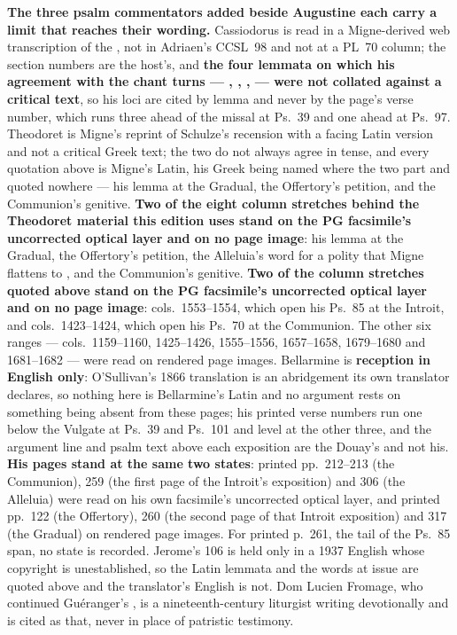 \textbf{The three psalm commentators added beside Augustine each carry a limit
that reaches their wording.} Cassiodorus is read in a Migne-derived web
transcription of the , not in Adriaen's CCSL~98 and
not at a PL~70 column; the section numbers are the host's, and \textbf{the four
lemmata on which his agreement with the chant turns --- ,
, ,  --- were not collated
against a critical text}, so his loci are cited by lemma and never by the page's
verse number, which runs three ahead of the missal at Ps.~39 and one ahead at
Ps.~97. Theodoret is Migne's reprint of Schulze's recension with a facing Latin
version and not a critical Greek text; the two do not always agree in tense, and
every quotation above is Migne's Latin, his Greek being named where the two part
and quoted nowhere ---%
\ifdefined\TriptychSynthesisEdition{} his lemma at the Gradual, the Offertory's petition, and the
Communion's genitive. \textbf{Two of the eight column stretches behind the
Theodoret material this edition uses stand on the PG facsimile's uncorrected
optical layer and on no page image}:%
\else{} his lemma at the Gradual, the Offertory's petition, the Alleluia's word for a
polity that Migne flattens to , and the Communion's genitive.
\textbf{Two of the column stretches quoted above stand on the PG facsimile's
uncorrected optical layer and on no page image}:%
\fi{} cols.\ 1553--1554, which open
his Ps.~85 at the Introit, and cols.\ 1423--1424, which open his Ps.~70 at the
Communion. The other six ranges --- cols.\ 1159--1160, 1425--1426, 1555--1556,
1657--1658, 1679--1680 and 1681--1682 --- were read on rendered page images.
Bellarmine is \textbf{reception in English only}: O'Sullivan's 1866 translation is an
abridgement its own translator declares, so nothing here is Bellarmine's Latin
and no argument rests on something being absent from these pages; his printed
verse numbers run one below the Vulgate at Ps.~39 and Ps.~101 and level at the
other three, and the argument line and psalm text above each exposition are the
Douay's and not his. \textbf{His pages stand at the same two states}: printed
pp.~212--213 (the Communion), 259 (the first page of the Introit's exposition)
and 306 (the Alleluia) were read on his own facsimile's uncorrected optical
layer, and printed pp.~122 (the Offertory), 260 (the second page of that Introit
exposition) and 317 (the Gradual) on rendered page images. For printed p.~261,
the tail of the Ps.~85 span, no state is recorded. Jerome's
 106 is held only in a 1937 English
whose copyright is unestablished, so the Latin lemmata and the words at issue
are quoted above and the translator's English is not. Dom Lucien Fromage, who
continued Guéranger's , is a nineteenth-century liturgist writing devotionally and is cited as that, never in
place of patristic testimony.

